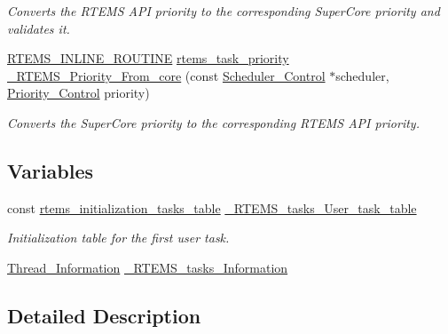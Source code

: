 \begin{DoxyCompactItemize}
\begin{DoxyCompactList}\small\item\em Converts the R\+T\+E\+MS A\+PI priority to the corresponding Super\+Core priority and validates it. \end{DoxyCompactList}\item 
\mbox{\hyperlink{group__RTEMSScoreBaseDefs_gac216239df231d5dbd15e3520b0b9313f}{R\+T\+E\+M\+S\+\_\+\+I\+N\+L\+I\+N\+E\+\_\+\+R\+O\+U\+T\+I\+NE}} \mbox{\hyperlink{group__ClassicTasks_gaa80a0c0938307d1e99d0eb5fee765b47}{rtems\+\_\+task\+\_\+priority}} \mbox{\hyperlink{group__ClassicTasksImpl_ga99fe6bff2379c967d79ae2b86cd2a0ae}{\+\_\+\+R\+T\+E\+M\+S\+\_\+\+Priority\+\_\+\+From\+\_\+core}} (const \mbox{\hyperlink{struct__Scheduler__Control}{Scheduler\+\_\+\+Control}} $\ast$scheduler, \mbox{\hyperlink{group__RTEMSScorePriority_ga59d02b58072d31a9a1cfe644557aefe2}{Priority\+\_\+\+Control}} priority)
\begin{DoxyCompactList}\small\item\em Converts the Super\+Core priority to the corresponding R\+T\+E\+MS A\+PI priority. \end{DoxyCompactList}\end{DoxyCompactItemize}
\subsection*{Variables}
\begin{DoxyCompactItemize}
\item 
const \mbox{\hyperlink{structrtems__initialization__tasks__table}{rtems\+\_\+initialization\+\_\+tasks\+\_\+table}} \mbox{\hyperlink{group__ClassicTasksImpl_ga08311c0396b6c585c4d4b0d8d971d62c}{\+\_\+\+R\+T\+E\+M\+S\+\_\+tasks\+\_\+\+User\+\_\+task\+\_\+table}}
\begin{DoxyCompactList}\small\item\em Initialization table for the first user task. \end{DoxyCompactList}\item 
\mbox{\hyperlink{structThread__Information}{Thread\+\_\+\+Information}} \mbox{\hyperlink{group__ClassicTasksImpl_ga2bbd56e70663be90a170a5fc112f564c}{\+\_\+\+R\+T\+E\+M\+S\+\_\+tasks\+\_\+\+Information}}
\end{DoxyCompactItemize}


\subsection{Detailed Description}


